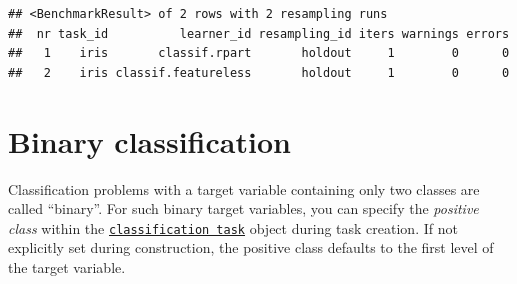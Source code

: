 \documentclass[
]{scrbook}
\newenvironment{Shaded}{\begin{snugshade}}{\end{snugshade}}
\newcommand{\AttributeTok}[1]{\textcolor[rgb]{0.77,0.63,0.00}{#1}}
\newcommand{\CommentTok}[1]{\textcolor[rgb]{0.56,0.35,0.01}{\textit{#1}}}
\newcommand{\FunctionTok}[1]{\textcolor[rgb]{0.00,0.00,0.00}{#1}}
\newcommand{\NormalTok}[1]{#1}
\newcommand{\OtherTok}[1]{\textcolor[rgb]{0.56,0.35,0.01}{#1}}
\newcommand{\SpecialCharTok}[1]{\textcolor[rgb]{0.00,0.00,0.00}{#1}}
\newcommand{\StringTok}[1]{\textcolor[rgb]{0.31,0.60,0.02}{#1}}
\renewenvironment{Shaded} {\begin{snugshade}\small} {\end{snugshade}}
\begin{document}
\begin{Shaded}
\end{Shaded}

\begin{verbatim}
## <BenchmarkResult> of 2 rows with 2 resampling runs
##  nr task_id          learner_id resampling_id iters warnings errors
##   1    iris       classif.rpart       holdout     1        0      0
##   2    iris classif.featureless       holdout     1        0      0
\end{verbatim}

\hypertarget{binary-classification}{%
\section{Binary classification}\label{binary-classification}}

Classification problems with a target variable containing only two classes are called ``binary''.
For such binary target variables, you can specify the \emph{positive class} within the \href{https://mlr3.mlr-org.com/reference/TaskClassif.html}{\texttt{classification\ task}} object during task creation.
If not explicitly set during construction, the positive class defaults to the first level of the target variable.

\begin{Shaded}
\end{Shaded}
\end{document}
